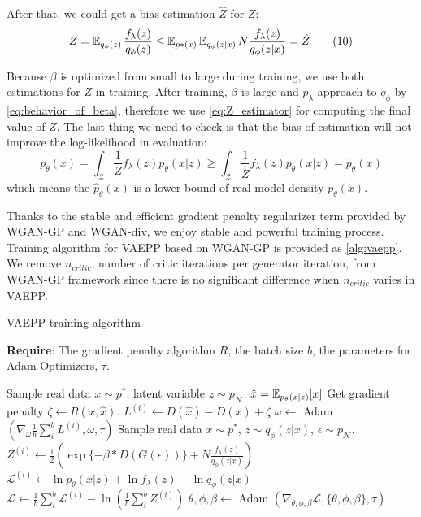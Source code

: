 After that, we could get a bias estimation $\hat{Z}$ for $Z$:
\begin{align*}\label{eq:Z_estimator}
	Z = \operatorname{\mathbb{E}}_{q_\phi(z)}\frac{f_\lambda(z)}{q_\phi(z)} \leq \operatorname{\mathbb{E}}_{p*(x)}\operatorname{\mathbb{E}}_{q_\phi(z|x)} N \frac{f_\lambda(z)}{q_\phi(z|x)} = \hat{Z} \tag{10}
\end{align*}

Because $\beta$ is optimized from small to large during training, we use both estimations for $Z$ in training. After training, $\beta$ is large and $p_\lambda$ approach to $q_\phi$ by \cref{eq:behavior_of_beta}, therefore we use \cref{eq:Z_estimator} for computing the final value of $Z$. The last thing we need to check is that the bias of estimation will not improve the log-likelihood in evaluation:
\begin{equation*}
	p_\theta(x) = \int_{\mathcal{Z}} \frac{1}{Z} f_\lambda(z) p_\theta(x|z) \geq \int_{\mathcal{Z}} \frac{1}{\hat{Z}} f_\lambda(z) p_\theta(x|z) = \hat{p}_\theta(x)
\end{equation*}
which means the $\hat{p}_\theta(x)$ is a lower bound of real model density $p_\theta(x)$.  

Thanks to the stable and efficient gradient penalty regularizer term provided by WGAN-GP and WGAN-div, we enjoy stable and powerful training process. Training algorithm for VAEPP based on WGAN-GP is provided as \cref{alg:vaepp}. We remove $n_{critic}$, number of critic iterations per generator iteration, from WGAN-GP framework since there is no significant difference when $n_{critic}$ varies in VAEPP.
\begin{algorithm}[tb]
\caption{VAEPP training algorithm}
\label{alg:vaepp}
\textbf{Require}: The gradient penalty algorithm $R$, the batch size $b$, the parameters for Adam Optimizers, $\tau$. 

\begin{algorithmic}[1] %
\STATE Sample real data $x \sim p^*$, latent variable $z \sim p_\mathcal{N}$.
\STATE	$\hat{x} = \operatorname{\mathbb{E}}_{p_\theta(x|z)}[x]$
\STATE Get gradient penalty $\zeta \gets R(x, \hat{x})$. 
\STATE $L^{(i)} \gets D(\hat{x}) - D(x) + \zeta$
\ENDFOR
\STATE $\omega \gets $ Adam $(\nabla_{\omega} \frac{1}{b}\sum_{i}^b L^{(i)}, \omega, \tau)$
\STATE Sample real data $x \sim p^*$, $z \sim q_\phi(z|x)$, $\epsilon \sim p_\mathcal{N}$.
\STATE $Z^{(i)} \gets \frac{1}{2}(\exp\{-\beta * D(G(\epsilon))\} + N \frac{f_\lambda(z)}{q_\phi(z|x)})$
\STATE $\mathcal{L}^{(i)} \gets \ln p_\theta(x|z) + \ln f_\lambda(z) - \ln q_\phi(z|x)$
\ENDFOR
\STATE $\mathcal{L} \gets \frac{1}{b}\sum_{i}^b \mathcal{L}^{(i)} - \ln (\frac{1}{b}\sum_{i}^b Z^{(i)})$
\STATE $\theta, \phi, \beta \gets $ Adam $(\nabla_{\theta, \phi, \beta} \mathcal{L}, \{\theta, \phi, \beta\}, \tau)$
\ENDWHILE
\end{algorithmic}
\end{algorithm}

